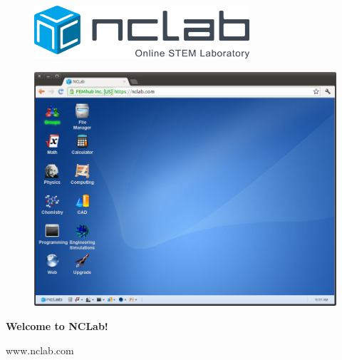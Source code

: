 \documentclass{article}
\begin{document}
\large

\vbox{}
\begin{figure}[!ht]
\includegraphics[width=8cm]{img/logo.png}
\vspace{12mm}
\end{figure}

\begin{figure}[!ht]
\begin{center}
\includegraphics[width=14cm]{img/desktop-0.png}
\vspace{16mm}
\end{center}
\end{figure}

\centerline{\Huge \bf Welcome to NCLab!}

\vfill

\centerline{\Large www.nclab.com}

\newpage
\hbox{}
\newpage


\newpage
\setcounter{tocdepth}{2}
\tableofcontents

\newpage

\pagestyle{plain}
\setcounter{page}{1}
\end{document}

